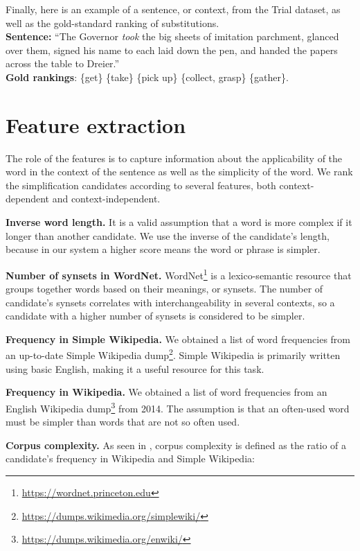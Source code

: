 \documentclass[10pt, a4paper]{article}
\begin{document}
Finally, here is an example of a sentence, or context, from the Trial dataset, as well as the gold-standard ranking of substitutions. \\
\textbf{Sentence:} ``The Governor \textit{took} the big sheets of imitation parchment, glanced over them, signed his name to each  laid down the pen, and handed the papers across the table to Dreier.'' \\
\textbf{Gold rankings}: \{get\} \{take\} \{pick up\} \{collect, grasp\} \{gather\}.

\section{Feature extraction}

The role of the features is to capture information about the applicability of the word in the context of the sentence as well as the simplicity of the word. We rank the simplification candidates according to several features, both context-dependent and context-independent.

\textbf{Inverse word length.} It is a valid assumption that a word is more complex if it longer than another candidate. We use the inverse of the candidate's length, because in our system a higher score means the word or phrase is simpler.

\textbf{Number of synsets in WordNet.} WordNet\footnote{\url{https://wordnet.princeton.edu}} is a lexico-semantic resource that groups together words based on their meanings, or synsets. The number of candidate's synsets correlates with interchangeability in several contexts, so a candidate with a higher number of synsets is considered to be simpler.

\textbf{Frequency in Simple Wikipedia.} We obtained a list of word frequencies from an up-to-date Simple Wikipedia dump\footnote{\url{https://dumps.wikimedia.org/simplewiki/}}. Simple Wikipedia is primarily written using basic English, making it a useful resource for this task.

\textbf{Frequency in Wikipedia.} We obtained a list of word frequencies from an English Wikipedia dump\footnote{\url{https://dumps.wikimedia.org/enwiki/}} from 2014. The assumption is that an often-used word must be simpler than words that are not so often used.

\textbf{Corpus complexity.} As seen in \citep{biran2011putting}, corpus complexity is defined as the ratio of a candidate's frequency in Wikipedia and Simple Wikipedia:
\end{document}
